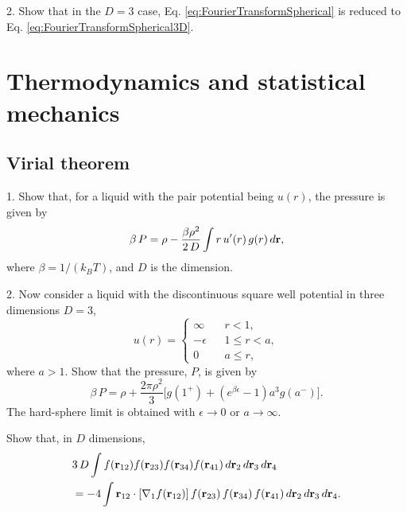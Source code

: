 \documentclass{book}
\begin{document}
2. Show that in the $D = 3$ case,
Eq. \eqref{eq:FourierTransformSpherical}
is reduced to
Eq. \eqref{eq:FourierTransformSpherical3D}.




\chapter{Thermodynamics and statistical mechanics}



\section{Virial theorem}




1. Show that, for a liquid with the pair potential being $u(r)$,
the pressure is given by
\begin{equation}
  \beta \, P = \rho - \frac{\beta \rho^2} {2\, D} \int r \, u'(r) \, g(r) \, d\boldsymbol{\mathbf{r}},
\end{equation}
where $\beta = 1/(k_BT)$, and $D$ is the dimension.

2. Now consider a liquid with the discontinuous square well potential
in three dimensions $D = 3$,
\begin{equation}
  u(r) =
  \begin{cases}
    \infty      \quad   & r < 1,          \\
    -\epsilon           & 1 \le r < a,    \\
    0                   & a \le r,
  \end{cases}
\end{equation}
where $a > 1$.
%
Show that the pressure, $P$, is given by
\begin{equation}
  \beta \, P = \rho
            + \frac{2 \pi \rho^2}{3}
              \big[g(1^+)
              + (e^{\beta \epsilon} - 1) a^3 g(a^-)\big].
\end{equation}
%
The hard-sphere limit is obtained with $\epsilon \rightarrow 0$
or $a \rightarrow \infty$.




Show that, in $D$ dimensions,
\begin{align*}
  &
  3 \, D
  \int
  f(\boldsymbol{\mathbf{r}}_{12}) f(\boldsymbol{\mathbf{r}}_{23}) f(\boldsymbol{\mathbf{r}}_{34}) f(\boldsymbol{\mathbf{r}}_{41})
  \, d\boldsymbol{\mathbf{r}}_2 \, d\boldsymbol{\mathbf{r}}_3 \, d\boldsymbol{\mathbf{r}}_4 \\
  &=
  -4 \int
  \boldsymbol{\mathbf{r}}_{12} \cdot [\nabla_1 f(\boldsymbol{\mathbf{r}}_{12})]
  \, f(\boldsymbol{\mathbf{r}}_{23}) \, f(\boldsymbol{\mathbf{r}}_{34}) \, f(\boldsymbol{\mathbf{r}}_{41})
  \, d\boldsymbol{\mathbf{r}}_2 \, d\boldsymbol{\mathbf{r}}_3 \, d\boldsymbol{\mathbf{r}}_4.
\end{align*}
\end{document}
